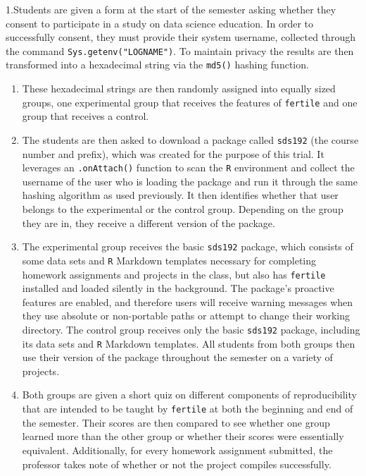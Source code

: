 \documentclass[12pt,twoside]{reedthesis}
\begin{document}
1.Students are given a form at the start of the semester asking whether
they consent to participate in a study on data science education. In
order to successfully consent, they must provide their system username,
collected through the command \texttt{Sys.getenv("LOGNAME")}. To
maintain privacy the results are then transformed into a hexadecimal
string via the \texttt{md5()} hashing function.
\begin{enumerate}
\def\labelenumi{\arabic{enumi}.}
\setcounter{enumi}{1}
\item
  These hexadecimal strings are then randomly assigned into equally
  sized groups, one experimental group that receives the features of
  \texttt{fertile} and one group that receives a control.
\item
  The students are then asked to download a package called
  \texttt{sds192} (the course number and prefix), which was created for
  the purpose of this trial. It leverages an \texttt{.onAttach()}
  function to scan the \texttt{R} environment and collect the username
  of the user who is loading the package and run it through the same
  hashing algorithm as used previously. It then identifies whether that
  user belongs to the experimental or the control group. Depending on
  the group they are in, they receive a different version of the
  package.
\item
  The experimental group receives the basic \texttt{sds192} package,
  which consists of some data sets and \texttt{R} Markdown templates
  necessary for completing homework assignments and projects in the
  class, but also has \texttt{fertile} installed and loaded silently in
  the background. The package's proactive features are enabled, and
  therefore users will receive warning messages when they use absolute
  or non-portable paths or attempt to change their working directory.
  The control group receives only the basic \texttt{sds192} package,
  including its data sets and \texttt{R} Markdown templates. All
  students from both groups then use their version of the package
  throughout the semester on a variety of projects.
\item
  Both groups are given a short quiz on different components of
  reproducibility that are intended to be taught by \texttt{fertile} at
  both the beginning and end of the semester. Their scores are then
  compared to see whether one group learned more than the other group or
  whether their scores were essentially equivalent. Additionally, for
  every homework assignment submitted, the professor takes note of
  whether or not the project compiles successfully.
\end{enumerate}
\end{document}
